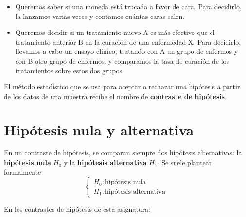\documentclass[
  spanish,
  letterpaper,
  DIV=11,
  numbers=noendperiod]{scrreprt}
\begin{document}
\begin{itemize}
\item
  Queremos saber si una moneda está trucada a favor de cara. Para
  decidirlo, la lanzamos varias veces y contamos cuántas caras salen.
\item
  Queremos decidir si un tratamiento nuevo A es más efectivo que el
  tratamiento anterior B en la curación de una enfermedad X. Para
  decidirlo, llevamos a cabo un ensayo clínico, tratando con A un grupo
  de enfermos y con B otro grupo de enfermos, y comparamos la tasa de
  curación de los tratamientos sobre estos dos grupos.
\end{itemize}

El método estadístico que se usa para aceptar o rechazar una hipótesis a
partir de los datos de una muestra recibe el nombre de \textbf{contraste
de hipótesis}.

\section{Hipótesis nula y
alternativa}\label{hipuxf3tesis-nula-y-alternativa}

En un contraste de hipótesis, se comparan siempre dos hipótesis
alternativas: la \textbf{hipótesis nula} \(H_{0}\) y la
\textbf{hipótesis alternativa} \(H_{1}\). Se suele plantear formalmente
\[
\left\{\begin{array}{ll}
H_{0}:\text{hipótesis nula}\\ 
H_{1}:\text{hipótesis alternativa}
\end{array}
\right.
\]

En los contrastes de hipótesis de esta asignatura:
\end{document}
